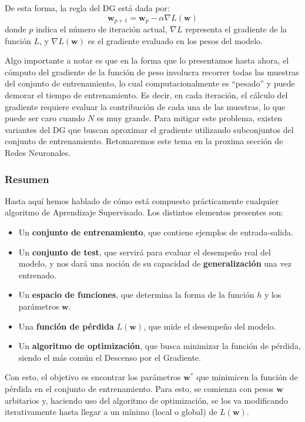 \documentclass[../../main.tex]{subfiles}
\begin{document}
De esta forma, la regla del DG está dada por:
\[
\bm{w}_{p+1} = \bm{w}_{p} - \alpha \nabla L(\bm{w})
\]
donde \(p\) indica el número de iteración actual, \(\nabla L\) representa el
gradiente de la función \(L\), y \(\nabla L(\bm{w})\) es el gradiente evaluado
en los pesos del modelo.

Algo importante a notar es que en la forma que lo presentamos hasta ahora, el cómputo del
gradiente de la función de peso involucra recorrer todas las muestras del conjunto de
entrenamiento, lo cual computacionalmente es ``pesado'' y puede demorar el tiempo de
entrenamiento. Es decir, en cada iteración, el cálculo del gradiente requiere evaluar la
contribución de cada una de las muestras, lo que puede ser caro cuando \(N\) es muy
grande. Para mitigar este problema, existen variantes del DG que buscan aproximar
el gradiente utilizando subconjuntos del conjunto de entrenamiento. Retomaremos este tema
en la proxima sección de Redes Neuronales.

\subsubsection{Resumen}
Hasta aquí hemos hablado de cómo está compuesto prácticamente cualquier algoritmo de
Aprendizaje Supervisado. Los distintos elementos presentes son:
\begin{itemize}[noitemsep]
    \item Un \textbf{conjunto de entrenamiento}, que contiene ejemplos de entrada-salida.
    \item Un \textbf{conjunto de test}, que servirá para evaluar el desempeño real del modelo,
    y nos dará una noción de su capacidad de \textbf{generalización} una vez entrenado.
    \item Un \textbf{espacio de funciones}, que determina la forma de la función \(h\) y los
    parámetros \(\bm{w}\).
    \item Una \textbf{función de pérdida} \(L(\bm{w})\), que mide el desempeño del modelo.
    \item Un \textbf{algoritmo de optimización}, que busca minimizar la función de pérdida,
    siendo el más común el Descenso por el Gradiente.
\end{itemize}

Con esto, el objetivo es encontrar los parámetros \(\bm{w}^*\) que minimicen la función de
pérdida en el conjunto de entrenamiento. Para esto, se comienza con pesos \(\bm{w}\)
arbitarios y, haciendo uso del algoritmo de optimización, se los va modificando iterativamente
hasta llegar a un mínimo (local o global) de \(L(\bm{w})\).
\end{document}
